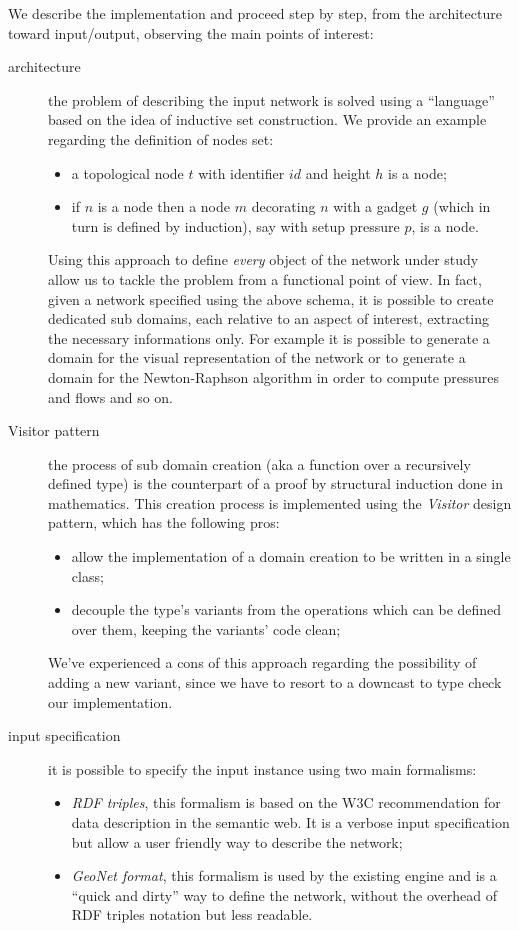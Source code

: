 \documentclass[twoside,openright,titlepage,fleqn,
headinclude,11pt,a4paper,BCOR5mm,footinclude ]{scrbook}
\begin{document}
We describe the implementation and proceed step by step, from the architecture
toward input/output, observing the main points of interest:
\begin{description}
\item[architecture] the problem of describing the input network is solved using
a ``language'' based on the idea of inductive set construction. We provide an
example regarding the definition of nodes set:
\begin{itemize}
	\item a topological node $t$ with identifier $id$ and height $h$ is a node;
	\item if $n$ is a node then a node $m$ decorating $n$ with a gadget $g$ 
		(which in turn is defined by induction), say with setup pressure $p$, 
		 is a node. 
\end{itemize}

Using this approach to define \emph{every} object of the network under study
allow us to tackle the problem from a functional point of view. In fact, given a
network specified using the above schema, it is possible to create dedicated
sub domains, each relative to an aspect of interest, extracting the
necessary informations only. For example it
is possible to generate a domain for the visual representation of the network or
to generate a domain for the Newton-Raphson algorithm in order to compute
pressures and flows and so on.

\item[Visitor pattern]
the process of sub domain creation (aka a function over a recursively defined
type) is the counterpart of a proof by structural
induction done in mathematics. This creation process is implemented using the
\emph{Visitor} design pattern, which has the following pros:
\begin{itemize}
	\item allow the implementation of a domain creation to be written in a
		single class;
	\item decouple the type's variants from the operations which can be 
		defined over them, keeping the variants' code clean;
\end{itemize}
We've experienced a cons of this approach regarding the possibility of adding a
new variant, since we have to resort to a downcast to type check our implementation.

\item[input specification] it is possible to specify the input instance using
two main formalisms:
\begin{itemize}
	\item \emph{RDF triples}, this formalism is based on the W3C
		recommendation for data description in the semantic web. It is a
		verbose input specification but allow a user friendly way to
		describe the network;
	\item \emph{GeoNet format}, this formalism is used by the existing
		engine and is a ``quick and dirty'' way to define the network,
		without the overhead of RDF triples notation but less
		readable.
\end{itemize}


\end{description}
\end{document}
